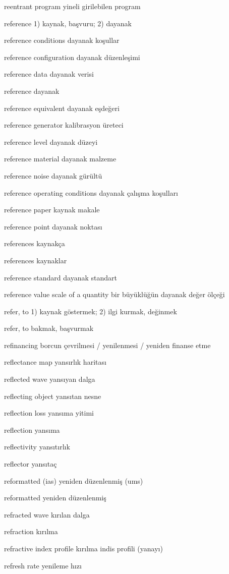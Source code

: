 \documentclass[12pt,fleqn]{article}\usepackage{../../common}
\begin{document}
reentrant program yineli girilebilen program

reference 1) kaynak, başvuru; 2) dayanak

reference conditions dayanak koşullar

reference configuration dayanak düzenleşimi

reference data dayanak verisi

reference dayanak

reference equivalent dayanak eşdeğeri

reference generator kalibrasyon üreteci

reference level dayanak düzeyi

reference material dayanak malzeme

reference noise dayanak gürültü

reference operating conditions dayanak çalışma koşulları

reference paper kaynak makale

reference point dayanak noktası

references kaynakça

references kaynaklar

reference standard dayanak standart

reference value scale of a quantity bir büyüklüğün dayanak değer ölçeği

refer, to 1) kaynak göstermek; 2) ilgi kurmak, değinmek

refer, to bakmak, başvurmak

refinancing borcun çevrilmesi / yenilenmesi / yeniden finanse etme

reflectance map yansırlık haritası

reflected wave yansıyan dalga

reflecting object yansıtan nesne

reflection loss yansıma yitimi

reflection yansıma

reflectivity yansıtırlık

reflector yansıtaç

reformatted (ias) yeniden düzenlenmiş (ums)

reformatted yeniden düzenlenmiş

refracted wave kırılan dalga

refraction kırılma

refractive index profile kırılma indis profili (yanayı)

refresh rate yenileme hızı
\end{document}
